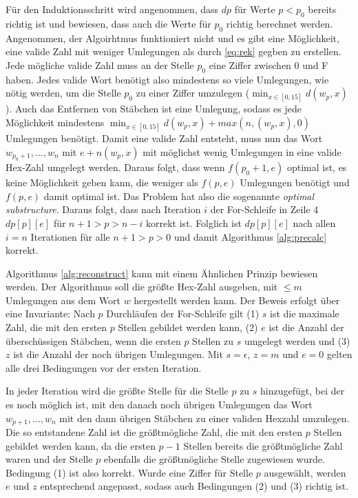 \documentclass[a4paper,10pt,ngerman]{scrartcl}
\begin{document}
Für den Induktionsschritt wird angenommen, dass $dp$ für Werte $p < p_0$ bereits richtig ist und bewiesen, dass auch die Werte für $p_0$ richtig berechnet werden. 
Angenommen, der Algoirhtmus funktioniert nicht und es gibt eine Möglichkeit, eine valide Zahl mit weniger Umlegungen als durch \ref*{eq:rek} gegben zu erstellen. 
Jede mögliche valide Zahl muss an der Stelle $p_0$ eine Ziffer zwischen 0 und F haben. Jedes valide Wort benötigt also mindestens so viele Umlegungen, wie nötig werden, um die Stelle $p_0$ zu einer Ziffer umzulegen ($\min_ {x \in [0,15]} d(w_p, x)$). 
Auch das Entfernen von Stäbchen ist eine Umlegung, sodass es jede Möglichkeit mindestens $\min_ {x \in [0,15]} d(w_p, x) + max(n,(w_p, x), 0)$ Umlegungen benötigt. 
Damit eine valide Zahl entsteht, muss nun das Wort $w_{p_0+1}, ..., w_n$ mit $e + n(w_p, x)$ mit möglichst wenig Umlegungen in eine valide Hex-Zahl umgelegt werden. Daraus folgt, dass wenn $f(p_0+1, e)$ optimal ist, es keine Möglichkeit geben kann, die weniger als $f(p, e)$ Umlegungen benötigt und $f(p, e)$ damit optimal ist. 
Das Problem hat also die sogenannte \textit{optimal substructure}.
Daraus folgt, dass nach Iteration $i$ der For-Schleife in Zeile 4 $dp[p][e]$ für $n+1 > p > n-i$ korrekt ist. 
Folglich ist $dp[p][e]$ nach allen $i = n$ Iterationen für alle $n+1 > p > 0$ und damit Algorithmus \ref*{alg:precalc} korrekt.  

Algorithmus \ref*{alg:reconstruct} kann mit einem Ähnlichen Prinzip bewiesen werden. 
Der Algorithmus soll die größte Hex-Zahl ausgeben, mit $\leq m$ Umlegungen aus dem Wort $w$ hergestellt werden kann. 
Der Beweis erfolgt über eine Invariante: Nach $p$ Durchläufen der For-Schleife gilt (1) $s$ ist die maximale Zahl, die mit den ersten $p$ Stellen gebildet werden kann, (2) $e$ ist die Anzahl der überschüssigen Stäbchen, wenn die ersten $p$ Stellen zu $s$ umgelegt werden und (3) $z$ ist die Anzahl der noch übrigen Umlegungen.
Mit $s = \epsilon$, $z = m$ und $e = 0$ gelten alle drei Bedingungen vor der ersten Iteration.

In jeder Iteration wird die größte Stelle für die Stelle $p$ zu $s$ hinzugefügt, bei der es noch möglich ist, mit den danach noch übrigen Umlegungen das Wort $w_{p+1}, ..., w_n$ mit den dann übrigen Stäbchen zu einer validen Hexzahl umzulegen. 
Die so entstandene Zahl ist die größtmögliche Zahl, die mit den ersten $p$ Stellen gebildet werden kann, da die ersten $p-1$ Stellen bereits die größtmögliche Zahl waren und der Stelle $p$ ebenfalls die größtmögliche Stelle zugewiesen wurde. 
Bedingung (1) ist also korrekt. Wurde eine Ziffer für Stelle $p$ ausgewählt, werden $e$ und $z$ entsprechend angepasst, sodass auch Bedingungen (2) und (3) richtig ist. 
\end{document}
